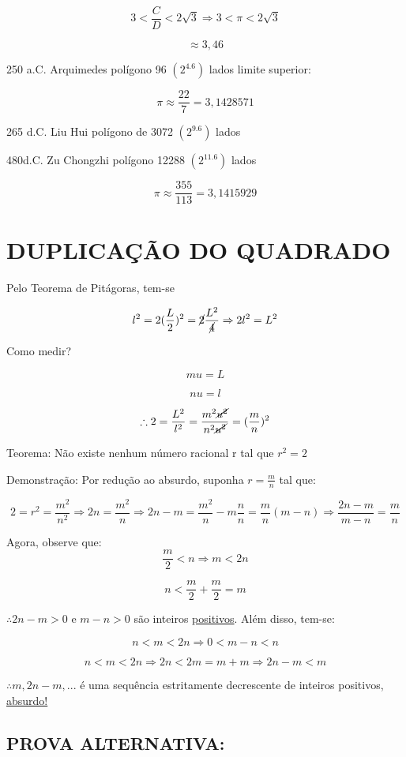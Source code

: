 \documentclass[a4paper, 12pt]{article}
\begin{document}
\[3 < \frac{C}{D} < 2\sqrt{3} \Rightarrow 3 < \pi < 2\sqrt{3}\]

\[\approx 3,46\] 

{250 a.C. Arquimedes polígono 96 $(2^4.6)$ lados limite superior:}

\[\pi \approx \frac{22}{7} = 3,1428571\]

{265 d.C. Liu Hui polígono de 3072 $(2^9.6)$ lados}

{480d.C. Zu Chongzhi polígono 12288 $(2^11.6)$ lados}

\[\pi \approx \frac{355}{113} = 3,1415929\]
\section{DUPLICAÇÃO DO QUADRADO}

{Pelo Teorema de Pitágoras, tem-se}

\[l^2 = 2 (\frac{L}{2})^2 = \cancel{2} \frac{L^2}{\cancel{4}} \Rightarrow 2l^2 = L^2\]

{Como medir?}

\[mu = L\]

\[nu = l\]

\[\therefore 2 = \frac{L^2}{l^2} = \frac{m^2 \cancel{u^2}}{n^2 \cancel{u^2}} = (\frac{m}{n})^2\]

{Teorema: Não existe nenhum número racional r tal que $r^2 = 2$}

{Demonstração: Por redução ao absurdo, suponha $r= \frac{m}{n}$ tal que:}

\[2=r^2 = \frac{m^2}{n^2} \Rightarrow 2n = \frac{m^2}{n} \Rightarrow 2n - m = \frac{m^2}{n} - m\frac{n}{n} = \frac{m}{n} (m-n) \Rightarrow \frac{2n-m}{m-n} = \frac{m}{n}\]

{Agora, observe que:}
\[\frac{m}{2} < n \Rightarrow m < 2n\]

\[n < \frac{m}{2} + \frac{m}{2} = m\]

{$\therefore 2n-m > 0$ e $ m-n > 0$ são inteiros \underline{positivos}. Além disso, tem-se:}

\[n < m < 2n \Rightarrow 0 < m-n < n\]

\[n < m < 2n \Rightarrow 2n < 2m = m + m \Rightarrow 2n - m < m\]


{$\therefore m, 2n-m,...$ é uma sequência estritamente decrescente de inteiros positivos, \underline{absurdo!}}

\subsection{PROVA ALTERNATIVA:} 
\end{document}
